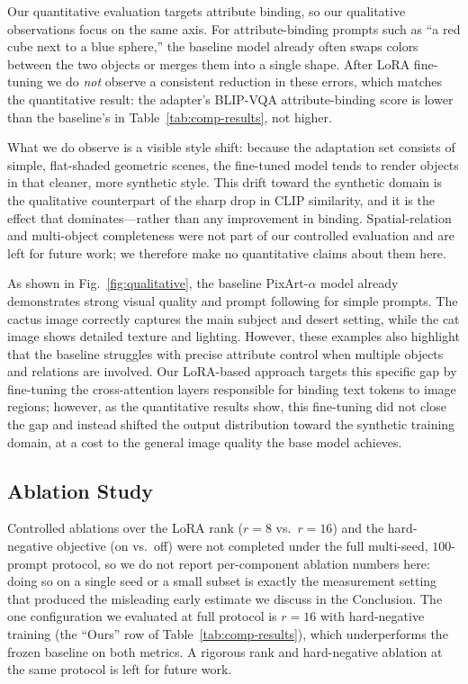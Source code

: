 \documentclass[12pt,onecolumn]{IEEEtran}
\begin{document}
Our quantitative evaluation targets attribute binding, so our qualitative
observations focus on the same axis. For attribute-binding prompts such as
``a red cube next to a blue sphere,'' the baseline model already often swaps
colors between the two objects or merges them into a single shape. After LoRA
fine-tuning we do \emph{not} observe a consistent reduction in these errors,
which matches the quantitative result: the adapter's BLIP-VQA
attribute-binding score is lower than the baseline's in
Table~\ref{tab:comp-results}, not higher.

What we do observe is a visible style shift: because the adaptation set consists
of simple, flat-shaded geometric scenes, the fine-tuned model tends to render
objects in that cleaner, more synthetic style. This drift toward the synthetic
domain is the qualitative counterpart of the sharp drop in CLIP similarity, and
it is the effect that dominates---rather than any improvement in binding.
Spatial-relation and multi-object completeness were not part of our controlled
evaluation and are left for future work; we therefore make no quantitative
claims about them here.

As shown in Fig.~\ref{fig:qualitative}, the baseline PixArt-$\alpha$ model
already demonstrates strong visual quality and prompt following for simple
prompts. The cactus image correctly captures the main subject and desert 
setting, while the cat image shows detailed texture and lighting. However, 
these examples also highlight that the baseline struggles with precise
attribute control when multiple objects and relations are involved. Our
LoRA-based approach targets this specific gap by fine-tuning the
cross-attention layers responsible for binding text tokens to image regions;
however, as the quantitative results show, this fine-tuning did not close the
gap and instead shifted the output distribution toward the synthetic training
domain, at a cost to the general image quality the base model achieves.

\subsection{Ablation Study}
Controlled ablations over the LoRA rank ($r{=}8$ vs.\ $r{=}16$) and the
hard-negative objective (on vs.\ off) were not completed under the full
multi-seed, $100$-prompt protocol, so we do not report per-component ablation
numbers here: doing so on a single seed or a small subset is exactly the
measurement setting that produced the misleading early estimate we discuss in
the Conclusion. The one configuration we evaluated at full protocol
is $r{=}16$ with hard-negative training (the ``Ours'' row of
Table~\ref{tab:comp-results}), which underperforms the frozen baseline on both
metrics. A rigorous rank and hard-negative ablation at the same protocol is left
for future work.
\end{document}
